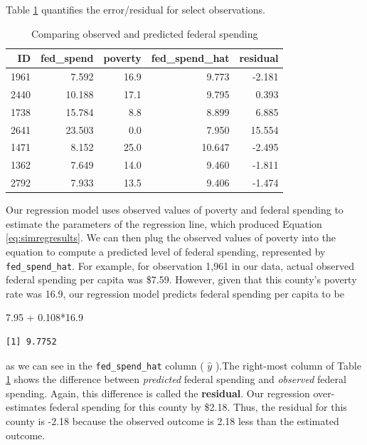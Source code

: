 \documentclass[
]{book}
\makeatletter
\newenvironment{Shaded}{\begin{snugshade}}{\end{snugshade}}
\newcommand{\FloatTok}[1]{\textcolor[rgb]{0.06,0.06,0.06}{#1}}
\newcommand{\SpecialCharTok}[1]{\textcolor[rgb]{0,0,0}{#1}}
\newenvironment{kframe}{%
\medskip{}
\setlength{\fboxsep}{.8em}
 \def\at@end@of@kframe{}%
 \ifinner\ifhmode%
  \def\at@end@of@kframe{\end{minipage}}%
  \begin{minipage}{\columnwidth}%
 \fi\fi%
 \def\FrameCommand##1{\hskip\@totalleftmargin \hskip-\fboxsep
 \colorbox{shadecolor}{##1}\hskip-\fboxsep
     \hskip-\linewidth \hskip-\@totalleftmargin \hskip\columnwidth}%
 \MakeFramed {\advance\hsize-\width
   \@totalleftmargin\z@ \linewidth\hsize
   \@setminipage}}%
 {\par\unskip\endMakeFramed%
 \at@end@of@kframe}
\renewenvironment{Shaded}{\begin{kframe}}{\end{kframe}}
\makeatother
\begin{document}
Table \ref{tab:simregexresid} quantifies the error/residual for select observations.

\begin{table}

\caption{\label{tab:simregexresid}Comparing observed and predicted federal spending}
\centering
\begin{tabular}[t]{r|r|r|r|r}
\hline
ID & fed\_spend & poverty & fed\_spend\_hat & residual\\
\hline
1961 & 7.592 & 16.9 & 9.773 & -2.181\\
\hline
2440 & 10.188 & 17.1 & 9.795 & 0.393\\
\hline
1738 & 15.784 & 8.8 & 8.899 & 6.885\\
\hline
2641 & 23.503 & 0.0 & 7.950 & 15.554\\
\hline
1471 & 8.152 & 25.0 & 10.647 & -2.495\\
\hline
1362 & 7.649 & 14.0 & 9.460 & -1.811\\
\hline
2792 & 7.933 & 13.5 & 9.406 & -1.474\\
\hline
\end{tabular}
\end{table}

Our regression model uses observed values of poverty and federal spending to estimate the parameters of the regression line, which produced Equation \eqref{eq:simregresults}. We can then plug the observed values of poverty into the equation to compute a predicted level of federal spending, represented by \texttt{fed\_spend\_hat}. For example, for observation 1,961 in our data, actual observed federal spending per capita was \$7.59. However, given that this county's poverty rate was 16.9, our regression model predicts federal spending per capita to be

\begin{Shaded}
\begin{Highlighting}[]
\FloatTok{7.95} \SpecialCharTok{+} \FloatTok{0.108}\SpecialCharTok{*}\FloatTok{16.9}
\end{Highlighting}
\end{Shaded}

\begin{verbatim}
[1] 9.7752
\end{verbatim}

as we can see in the \texttt{fed\_spend\_hat} column ( \(\hat{y}\) ).The right-most column of Table \ref{tab:simregexresid} shows the difference between \emph{predicted} federal spending and \emph{observed} federal spending. Again, this difference is called the \textbf{residual}. Our regression over-estimates federal spending for this county by \$2.18. Thus, the residual for this county is -2.18 because the observed outcome is 2.18 less than the estimated outcome.
\end{document}
